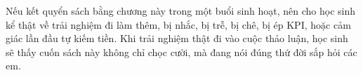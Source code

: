 \begin{goigiaovien}
Nếu kết quyển sách bằng chương này trong một buổi sinh hoạt, nên cho học sinh kể thật về trải nghiệm đi làm thêm, bị nhắc, bị trễ, bị chê, bị ép KPI, hoặc cảm giác lần đầu tự kiếm tiền. Khi trải nghiệm thật đi vào cuộc thảo luận, học sinh sẽ thấy cuốn sách này không chỉ chọc cười, mà đang nói đúng thứ đời sắp hỏi các em.
\end{goigiaovien}

\ngancach